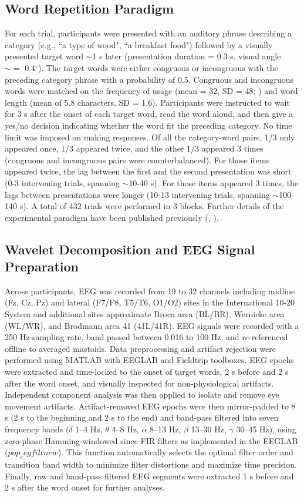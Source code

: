 \documentclass[Afour,times,sageh]{sagej}
\begin{document}
\subsection{Word Repetition Paradigm}
For each trial, participants were presented with an auditory phrase describing a category (e.g., ``a type of wood", ``a breakfast food") followed by a visually presented target word $\sim$1 s later (presentation duration = 0.3 s, visual angle $\sim =$ 0.4$^{\circ}$). The target words were either congruous or incongruous with the preceding category phrase with a probability of 0.5. Congruous and incongruous words were matched on the frequency of usage (mean = 32, SD = 48; \citet{kucera}) and word length (mean of 5.8 characters, SD = 1.6). Participants were instructed to wait for 3 s after the onset of each target word, read the word aloud, and then give a yes/no decision indicating whether the word fit the preceding category. No time limit was imposed on making responses. Of all the category-word pairs, 1/3 only appeared once, 1/3 appeared twice, and the other 1/3 appeared 3 times (congruous and incongruous pairs were counterbalanced). For those items appeared twice, the lag between the first and the second presentation was short (0-3 intervening trials, spanning $\sim$10-40 s). For those items appeared 3 times, the lags between presentations were longer (10-13 intervening trials, spanning $\sim$100-140 s). A total of 432 trials were performed in 3 blocks. Further details of the experimental paradigm have been published previously (\citet{Olichney2000}, \citet{OlchneyP600}). 
\subsection{Wavelet Decomposition and EEG Signal Preparation}
Across participants, EEG was recorded from 19 to 32 channels including midline (Fz, Cz, Pz) and lateral (F7/F8, T5/T6, O1/O2) sites in the International 10-20 System and additional sites approximate Broca area (BL/BR), Wernicke area (WL/WR), and Brodmann area 41 (41L/41R). EEG signals were recorded with a 250 Hz sampling rate, band passed between 0.016 to 100 Hz, and re-referenced offline to averaged mastoids. Data preprocessing and artifact rejection were performed using MATLAB \citep{MatLab} with EEGLAB \citep{EEGLAB} and Fieldtrip \citep{FieldTrip} toolboxes.
EEG epochs were extracted and time-locked to the onset of target words, 2 s before and 2 s after the word onset, and visually inspected for non-physiological artifacts. Independent component analysis \citep{ICA} was then applied to isolate and remove eye movement artifacts. Artifact-removed EEG epochs were then mirror-padded to 8 s (2 s to the beginning and 2 s to the end) and band-pass filtered into seven frequency bands ($\delta$ 1–4 Hz, $\theta$ 4–8 Hz, $\alpha$ 8–13 Hz, $\beta$ 13–30 Hz, $\gamma$ 30–45 Hz), using zero-phase Hamming-windowed since FIR filters as implemented in the EEGLAB ($pop_eegfiltnew$). This function automatically selects the optimal filter order and transition band width to minimize filter distortions and maximize time precision. Finally, raw and band-pass filtered EEG segments were extracted 1 s before and 2 s after the word onset for further analyses.
\end{document}
